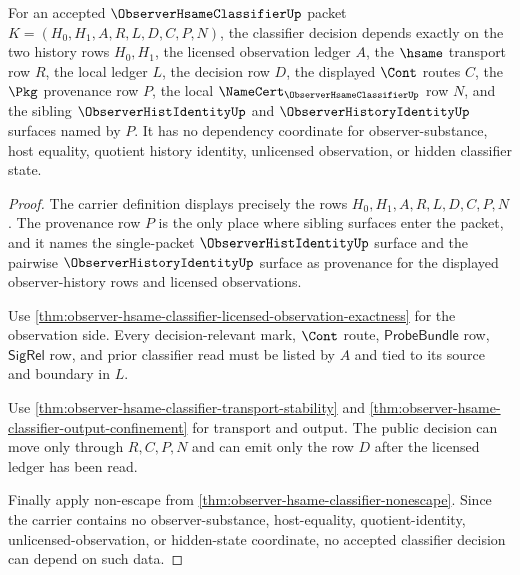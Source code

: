 \begin{theorem}
\label{thm:observer-hsame-classifier-dependency-scope}
For an accepted $\ObserverHsameClassifierUp$ packet $K=(H_0,H_1,A,R,L,D,C,P,N)$, the classifier decision depends exactly on the two history rows $H_0,H_1$, the licensed observation ledger $A$, the $\hsame$ transport row $R$, the local ledger $L$, the decision row $D$, the displayed $\Cont$ routes $C$, the $\Pkg$ provenance row $P$, the local $\NameCert_{\ObserverHsameClassifierUp}$ row $N$, and the sibling $\ObserverHistIdentityUp$ and $\ObserverHistoryIdentityUp$ surfaces named by $P$. It has no dependency coordinate for observer-substance, host equality, quotient history identity, unlicensed observation, or hidden classifier state.
\end{theorem}
\begin{proof}
The carrier definition displays precisely the rows $H_0,H_1,A,R,L,D,C,P,N$. The provenance row $P$ is the only place where sibling surfaces enter the packet, and it names the single-packet $\ObserverHistIdentityUp$ surface and the pairwise $\ObserverHistoryIdentityUp$ surface as provenance for the displayed observer-history rows and licensed observations.

Use \autoref{thm:observer-hsame-classifier-licensed-observation-exactness} for the observation side. Every decision-relevant mark, $\Cont$ route, $\mathsf{ProbeBundle}$ row, $\mathsf{SigRel}$ row, and prior classifier read must be listed by $A$ and tied to its source and boundary in $L$.

Use \autoref{thm:observer-hsame-classifier-transport-stability} and \autoref{thm:observer-hsame-classifier-output-confinement} for transport and output. The public decision can move only through $R,C,P,N$ and can emit only the row $D$ after the licensed ledger has been read.

Finally apply non-escape from \autoref{thm:observer-hsame-classifier-nonescape}. Since the carrier contains no observer-substance, host-equality, quotient-identity, unlicensed-observation, or hidden-state coordinate, no accepted classifier decision can depend on such data.
\end{proof}

